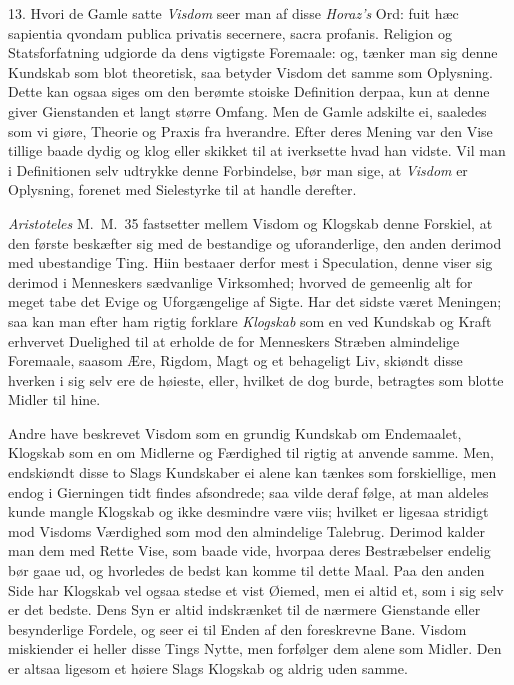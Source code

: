 \documentclass[12pt,a4paper]{article}
\newcommand{\opage}[1]{\marginnote{\footnotesize\textit{[#1]}}}
\begin{document}
13. Hvori de Gamle satte \emph{Visdom} seer man af disse \emph{Horaz's} Ord: fuit hæc
sapientia qvondam publica privatis secernere, sacra profanis. Religion og Statsforfatning
udgiorde da dens vigtigste Foremaale: og, tænker man sig denne Kundskab som blot
theoretisk, saa betyder Visdom det samme som Oplysning. Dette kan ogsaa siges om den
berømte stoiske Definition derpaa, kun at denne giver Gienstanden et langt større Omfang.
Men de Gamle adskilte ei, saaledes som vi giøre, Theorie og Praxis fra hverandre. Efter
deres Mening var den Vise tillige baade dydig og klog eller skikket til at iverksette hvad
han vidste. Vil man i Definitionen selv udtrykke denne Forbindelse, bør man sige, at
\emph{Visdom} er Oplysning, forenet med Sielestyrke til at handle derefter.

\emph{Aristoteles} M.~M.\ 35 fastsetter mellem Visdom og Klogskab denne Forskiel, at den
første beskæfter sig med de bestandige og uforanderlige, den anden derimod med ubestandige
Ting. Hiin bestaaer derfor mest i Speculation, denne viser sig derimod i Menneskers
sædvanlige Virksomhed; hvorved de gemeenlig alt for meget tabe det Evige og Uforgængelige
af Sigte. Har det sidste været Meningen; saa kan man efter ham rigtig forklare
\emph{Klogskab} som en ved Kundskab og Kraft erhvervet Duelighed til at erholde de for
Menneskers
\opage{185} Stræben almindelige Foremaale, saasom Ære, Rigdom, Magt og et behageligt Liv, skiøndt
disse hverken i sig selv ere de høieste, eller, hvilket de dog burde, betragtes som blotte
Midler til hine.

Andre have beskrevet Visdom som en grundig Kundskab om Endemaalet, Klogskab som en om
Midlerne og Færdighed til rigtig at anvende samme. Men, endskiøndt disse to Slags
Kundskaber ei alene kan tænkes som forskiellige, men endog i Gierningen tidt findes
afsondrede; saa vilde deraf følge, at man aldeles kunde mangle Klogskab og ikke desmindre
være viis; hvilket er ligesaa stridigt mod Visdoms Værdighed som mod den almindelige
Talebrug. Derimod kalder man dem med Rette Vise, som baade vide, hvorpaa deres
Bestræbelser endelig bør gaae ud, og hvorledes de bedst kan komme til dette Maal. Paa den
anden Side har Klogskab vel ogsaa stedse et vist Øiemed, men ei altid et, som i sig selv
er det bedste. Dens Syn er altid indskrænket til de nærmere Gienstande eller besynderlige
Fordele, og seer ei til Enden af den foreskrevne Bane. Visdom miskiender ei heller disse
Tings Nytte, men forfølger dem alene som Midler. Den er altsaa ligesom et høiere Slags
Klogskab og aldrig uden samme.
\end{document}
